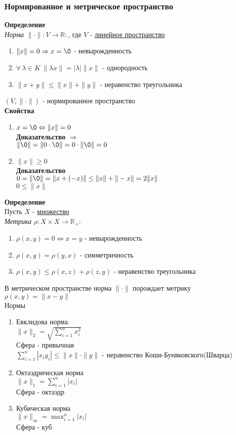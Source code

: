 \documentclass[12pt]{article}
\begin{document}
\subsubsection{Нормированное и метрическое пространство}
\textbf{Определение}\\
\textit{Норма} $\|\cdot\| : V \rightarrow \mathbb{R}:$, где $V$ - \underline{линейное пространство}
\begin{enumerate}
    \item $\|x\|=0 \Rightarrow x = \0$ - невырожденность
    \item $\forall\,\lambda\in K\ \|\lambda x\| = |\lambda|\|x\|$ - однородность
    \item $\|x+y\| \leq \|x\| + \|y\|$ - неравенство треугольника
\end{enumerate}
$(V,\|\cdot\|)$ - нормированное пространство\\
\textbf{Свойства}
\begin{enumerate}
    \item $x = \0 \Leftrightarrow \|x\| = 0$\\
    \textbf{Доказательство $\Rightarrow$}\\
    $\|\0\| = \|0\cdot\0\| = 0\cdot\|\0\| = 0$
    \item $\|x\| \geq 0$\\
    \textbf{Доказательство}\\
    $0 = \|\0\| = \|x+(-x)\| \leq \|x\| + \|-x\| = 2\|x\|$\\
    $0 \leq \|x\|$
\end{enumerate}
\textbf{Определение}\\
Пусть $X$ - \ul{множество}\\
\textit{Метрика} $\rho: X\times X \rightarrow \mathbb{R}_+:$
\begin{enumerate}
    \item $\rho(x,y) = 0 \Leftrightarrow x = y$ - невырожденность
    \item $\rho(x,y) = \rho(y,x)$ - симметричность
    \item $\rho(x,y) \leq \rho(x,z) + \rho(z,y)$ - неравенство треугольника
\end{enumerate}
В метрическом пространстве норма $\|\cdot\|$ порождает метрику $\rho(x,y) = \|x-y\|$\\
Нормы
\begin{enumerate}
    \item Евклидова норма:\\
    $\|x\|_2 = \sqrt{\sum_{i=1}^n x_i^2}$\\
    Сфера - привычная\\
    $\sum_{i=1}^n |x_iy_i| \leq \|x\|\cdot\|y\|$ - неравенство Коши-Буняковского(Шварца)
    \item Октаэдрическая норма\\
    $\|x\|_1 = \sum_{i=1}^n |x_i|$\\
    Сфера - октаэдр
    \item Кубическая норма\\
    $\|x\|_\infty = \max_{i=1}^n |x_i|$\\
    Сфера - куб
\end{enumerate}
\end{document}
